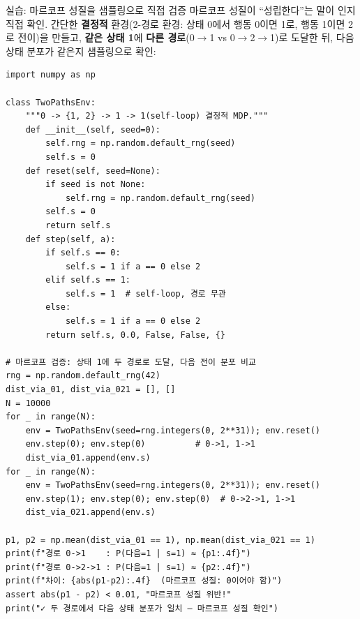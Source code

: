 \begin{frame}[fragile,shrink=40]{실습: 마르코프 성질을 샘플링으로 직접 검증}
  마르코프 성질이 ``성립한다''는 말이 인지 직접 확인. 간단한 \textbf{결정적} 환경(2-경로 환경:
  상태 0에서 행동 0이면 1로, 행동 1이면 2로 전이)을 만들고,
  \textbf{같은 상태 1}에 \textbf{다른 경로}(0$\to$1 vs
  0$\to$2$\to$1)로 도달한 뒤, 다음 상태 분포가 같은지 샘플링으로
  확인:
  \begin{lstlisting}
import numpy as np

class TwoPathsEnv:
    """0 -> {1, 2} -> 1 -> 1(self-loop) 결정적 MDP."""
    def __init__(self, seed=0):
        self.rng = np.random.default_rng(seed)
        self.s = 0
    def reset(self, seed=None):
        if seed is not None:
            self.rng = np.random.default_rng(seed)
        self.s = 0
        return self.s
    def step(self, a):
        if self.s == 0:
            self.s = 1 if a == 0 else 2
        elif self.s == 1:
            self.s = 1  # self-loop, 경로 무관
        else:
            self.s = 1 if a == 0 else 2
        return self.s, 0.0, False, False, {}

# 마르코프 검증: 상태 1에 두 경로로 도달, 다음 전이 분포 비교
rng = np.random.default_rng(42)
dist_via_01, dist_via_021 = [], []
N = 10000
for _ in range(N):
    env = TwoPathsEnv(seed=rng.integers(0, 2**31)); env.reset()
    env.step(0); env.step(0)          # 0->1, 1->1
    dist_via_01.append(env.s)
for _ in range(N):
    env = TwoPathsEnv(seed=rng.integers(0, 2**31)); env.reset()
    env.step(1); env.step(0); env.step(0)  # 0->2->1, 1->1
    dist_via_021.append(env.s)

p1, p2 = np.mean(dist_via_01 == 1), np.mean(dist_via_021 == 1)
print(f"경로 0->1    : P(다음=1 | s=1) ≈ {p1:.4f}")
print(f"경로 0->2->1 : P(다음=1 | s=1) ≈ {p2:.4f}")
print(f"차이: {abs(p1-p2):.4f}  (마르코프 성질: 0이어야 함)")
assert abs(p1 - p2) < 0.01, "마르코프 성질 위반!"
print("✓ 두 경로에서 다음 상태 분포가 일치 — 마르코프 성질 확인")
  \end{lstlisting}
\end{frame}
